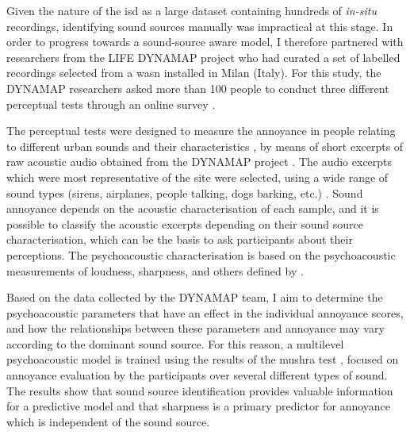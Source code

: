 Given the nature of the \gls{isd} as a large dataset containing hundreds of \emph{in-situ} recordings, identifying sound sources manually was impractical at this stage. In order to progress towards a sound-source aware model, I therefore partnered with researchers from the LIFE DYNAMAP project who had curated a set of labelled recordings selected from a \gls{wasn} installed in Milan (Italy). For this study, the DYNAMAP researchers asked more than 100 people to conduct three different perceptual tests through an online survey \citep{AlsinaPages2021Perceptual}. 

The perceptual tests were designed to measure the annoyance in people relating to different urban sounds and their characteristics \citep{LabairuTrenchs2018Noise,AlsinaPages2021Perceptual}, by means of short excerpts of raw acoustic audio obtained from the DYNAMAP project \citep{Sevillano2016DYNAMAP}. The audio excerpts which were most representative of the site were selected, using a wide range of sound types (sirens, airplanes, people talking, dogs barking, etc.) \citep{Alias2020Aggregate,Alias2020WASN}. Sound annoyance depends on the acoustic characterisation of each sample, and it is possible to classify the acoustic excerpts depending on their sound source characterisation, which can be the basis to ask participants about their perceptions. The psychoacoustic characterisation is based on the psychoacoustic measurements of loudness, sharpness, and others defined by \citet{PsychoacousticsfactsmodelsZwicker}.

Based on the data collected by the DYNAMAP team, I aim to determine the psychoacoustic parameters that have an effect in the individual annoyance scores, and how the relationships between these parameters and annoyance may vary according to the dominant sound source. For this reason, a multilevel psychoacoustic model is trained using the results of the \gls{mushra} test \citep{IRB2015Method}, focused on annoyance evaluation by the participants over several different types of sound. The results show that sound source identification provides valuable information for a predictive model and that sharpness is a primary predictor for annoyance which is independent of the sound source.


